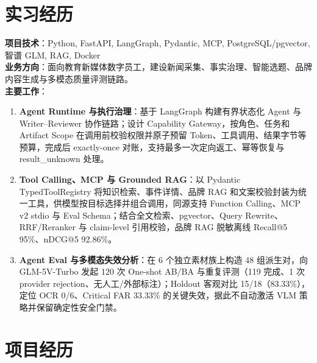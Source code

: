 \documentclass{resume}
\begin{document}
\section{实习经历}
\textbf{项目技术}：Python, FastAPI, LangGraph, Pydantic, MCP, PostgreSQL/pgvector, 智谱 GLM, RAG, Docker\\
\textbf{业务方向}：面向教育新媒体数字员工，建设新闻采集、事实治理、智能选题、品牌内容生成与多模态质量评测链路。\\
\textbf{主要工作}：
\begin{enumerate}[parsep=0.5ex]
    \item \textbf{Agent Runtime 与执行治理}：基于 LangGraph 构建有界状态化 Agent 与 Writer--Reviewer 协作链路；设计 Capability Gateway，按角色、任务和 Artifact Scope 在调用前校验权限并原子预留 Token、工具调用、结果字节等预算，完成后 exactly-once 对账，支持最多一次定向返工、幂等恢复与 result\_unknown 处理。
    \item \textbf{Tool Calling、MCP 与 Grounded RAG}：以 Pydantic TypedToolRegistry 将知识检索、事件详情、品牌 RAG 和文案校验封装为统一工具，供模型按目标选择并组合调用，同源支持 Function Calling、MCP v2 stdio 与 Eval Schema；结合全文检索、pgvector、Query Rewrite、RRF/Reranker 与 claim-level 引用校验，品牌 RAG 脱敏离线 Recall@5 95\%、nDCG@5 92.86\%。
    \item \textbf{Agent Eval 与多模态失效分析}：在 6 个独立素材族上构造 48 组派生对，向 GLM-5V-Turbo 发起 120 次 One-shot AB/BA 与重复评测（119 完成、1 次 provider rejection、无人工/外部标注）；Holdout 客观对比 15/18（83.33\%），定位 OCR 0/6、Critical FAR 33.33\% 的关键失效，据此不自动激活 VLM 策略并保留确定性安全门禁。
\end{enumerate}

\section{项目经历}
\end{document}
